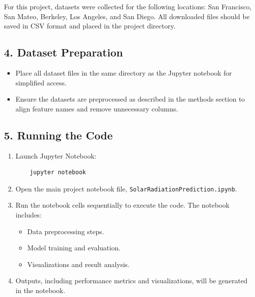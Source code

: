 \documentclass[10pt,twocolumn]{article}
\begin{document}
\begin{itemize}
For this project, datasets were collected for the following locations: San Francisco, San Mateo, Berkeley, Los Angeles, and San Diego. All downloaded files should be saved in CSV format and placed in the project directory.

\subsection*{4. Dataset Preparation}
\begin{itemize}
    \item Place all dataset files in the same directory as the Jupyter notebook for simplified access.
    \item Ensure the datasets are preprocessed as described in the methods section to align feature names and remove unnecessary columns.
\end{itemize}

\subsection*{5. Running the Code}
\begin{enumerate}
    \item Launch Jupyter Notebook:
    \begin{verbatim}
    jupyter notebook
    \end{verbatim}
    \item Open the main project notebook file, \texttt{SolarRadiationPrediction.ipynb}.
    \item Run the notebook cells sequentially to execute the code. The notebook includes:
    \begin{itemize}
        \item Data preprocessing steps.
        \item Model training and evaluation.
        \item Visualizations and result analysis.
    \end{itemize}
    \item Outputs, including performance metrics and visualizations, will be generated in the notebook.
\end{enumerate}


\end{itemize}
\end{document}
